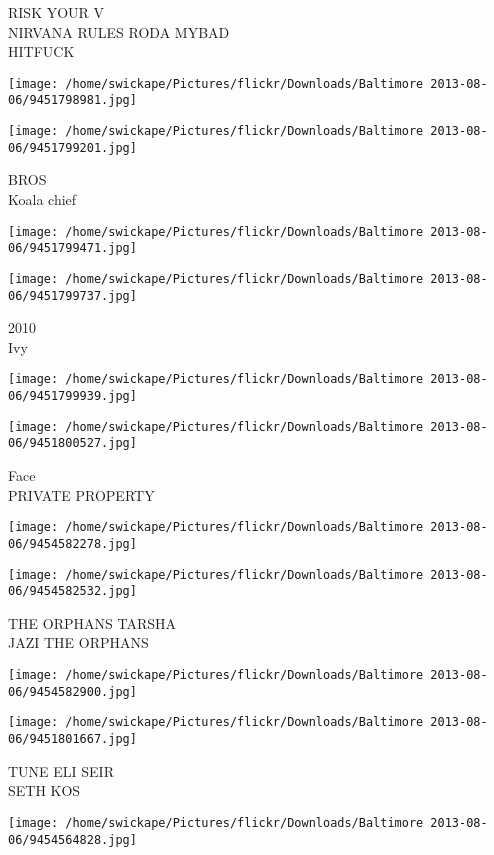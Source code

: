 \documentclass[10pt,letterpaper]{article}
\begin{document}
RISK YOUR V\\
NIRVANA RULES RODA MYBAD\\
HITFUCK
\pagebreak

\texttt{[image: /home/swickape/Pictures/flickr/Downloads/Baltimore 2013-08-06/9451798981.jpg]}

\vspace{0.25in}
\texttt{[image: /home/swickape/Pictures/flickr/Downloads/Baltimore 2013-08-06/9451799201.jpg]}

BROS\\
Koala chief
\pagebreak

\texttt{[image: /home/swickape/Pictures/flickr/Downloads/Baltimore 2013-08-06/9451799471.jpg]}

\vspace{0.25in}
\texttt{[image: /home/swickape/Pictures/flickr/Downloads/Baltimore 2013-08-06/9451799737.jpg]}

2010\\
Ivy
\pagebreak

\texttt{[image: /home/swickape/Pictures/flickr/Downloads/Baltimore 2013-08-06/9451799939.jpg]}

\vspace{0.25in}
\texttt{[image: /home/swickape/Pictures/flickr/Downloads/Baltimore 2013-08-06/9451800527.jpg]}

Face\\
PRIVATE PROPERTY
\pagebreak

\texttt{[image: /home/swickape/Pictures/flickr/Downloads/Baltimore 2013-08-06/9454582278.jpg]}

\vspace{0.25in}
\texttt{[image: /home/swickape/Pictures/flickr/Downloads/Baltimore 2013-08-06/9454582532.jpg]}

THE ORPHANS TARSHA\\
JAZI THE ORPHANS
\pagebreak

\texttt{[image: /home/swickape/Pictures/flickr/Downloads/Baltimore 2013-08-06/9454582900.jpg]}

\vspace{0.25in}
\texttt{[image: /home/swickape/Pictures/flickr/Downloads/Baltimore 2013-08-06/9451801667.jpg]}

TUNE ELI SEIR\\
SETH KOS
\pagebreak

\texttt{[image: /home/swickape/Pictures/flickr/Downloads/Baltimore 2013-08-06/9454564828.jpg]}
\end{document}
